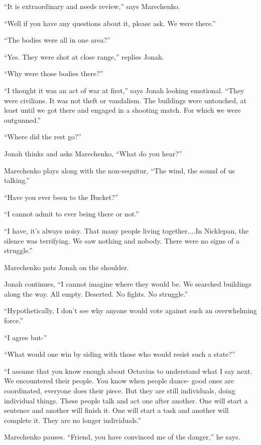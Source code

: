 ``It is extraordinary and needs review,'' says Marechenko.

``Well if you have any questions about it, please ask.  We were there.''

``The bodies were all in one area?''

``Yes. They were shot at close range,'' replies Jonah.

``Why were those bodies there?''

``I thought it was an act of war at first,'' says Jonah looking emotional.  ``They were civilians.  It was not theft or vandalism.  The buildings were untouched, at least until we got there and engaged in a shooting match.  For which we were outgunned.''

``Where did the rest go?''

Jonah thinks and asks Marechenko, ``What do you hear?''

Marechenko plays along with the non-sequitur, ``The wind, the sound of us talking.''

``Have you ever been to the Bucket?''

``I cannot admit to ever being there or not.''

``I have, it's always noisy.  That many people living together....In Nicklepan, the silence was terrifying.  We saw nothing and nobody.  There were no signs of a struggle.''

Marechenko pats Jonah on the shoulder.

Jonah continues, ``I cannot imagine where they would be.  We searched buildings along the way.  All empty.  Deserted.  No fights.  No struggle.''

``Hypothetically, I don't see why anyone would vote against such an overwhelming force.''

``I agree but-''

``What would one win by siding with those who would resist such a state?''

``I assume that you know enough about Octavius to understand what I say next.  We encountered their people.  You know when people dance- good ones are coordinated, everyone does their piece.  But they are still individuals, doing individual things.  These people talk and act one after another.  One will start a sentence and another will finish it.  One will start a task and another will complete it.  They are no longer individuals.''

Marechenko pauses.  ``Friend, you have convinced me of the danger,'' he says.

